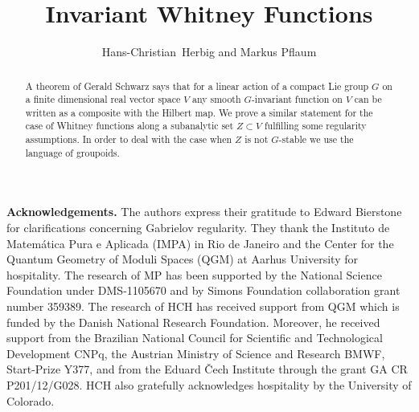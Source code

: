 \documentclass[twoside]{amsart}
\numberwithin{equation}{section}
\theoremstyle{plain}
\theoremstyle{definition}
\begin{document}
\title{Invariant Whitney Functions}

\author{Hans-Christian~Herbig and Markus Pflaum}
\address{Hans-Christian~Herbig\newline\indent
        Universidade Federal de Rio de Janeiro,
        Departamento de Matem\'atica Aplicada\newline\indent
        CEP 21941-909 - Rio de Janeiro, Brazil}
\address{Markus J. Pflaum\newline\indent
         Department of Mathematics, University of Colorado, 
         Boulder, CO 80309-0395, USA}   

\begin{abstract} 
A theorem of Gerald Schwarz \cite[Thm.~1]{SchwaSFIACLG} says that for a linear action of a compact Lie group $G$ on a finite dimensional real vector space $V$ any smooth $G$-invariant function on $V$ can be written as a composite with the Hilbert map. We prove a similar statement for the case of Whitney functions along a subanalytic set $Z\subset V$ fulfilling some regularity assumptions. In order to deal with the case when $Z$ is not $G$-stable we use the language of groupoids.
\end{abstract}
\maketitle
\tableofcontents


{\bf Acknowledgements.}
The authors express their gratitude to Edward Bierstone for clarifications 
concerning  Gabrielov regularity. They thank the Instituto de Matem\'atica 
Pura e Aplicada (IMPA) in Rio de Janeiro and the Center for the Quantum
Geometry of Moduli Spaces (QGM) at Aarhus University for hospitality.
The research of MP has been supported by the National Science Foundation 
under DMS-1105670 and by Simons Foundation collaboration grant number 359389.
The research of HCH has received support from QGM which is funded by the Danish 
National Research Foundation. Moreover, he received support from the
Brazilian National Council for Scientific and Technological Development CNPq,
the Austrian Ministry of Science and Research BMWF, Start-Prize Y377, and from
the Eduard {\v C}ech Institute through the grant GA CR P201/12/G028.
HCH also gratefully acknowledges hospitality by the University of Colorado. 


\begin{appendix}
%   
\end{appendix}

\end{document}
